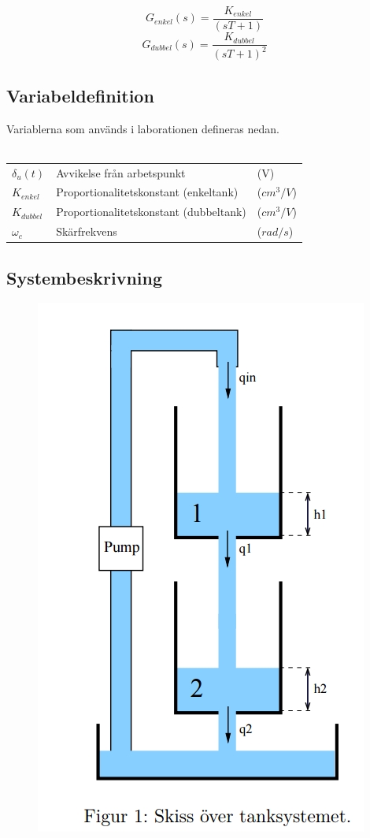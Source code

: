\documentclass[a4paper]{article}
\begin{document}
\begin{equation}
  G_{enkel}(s)=\frac{K_{enkel}}{(sT+1)}
\end{equation}
\begin{equation}
  G_{dubbel}(s)=\frac{K_{dubbel}}{(sT+1)^2}
\end{equation}

\subsection{Variabeldefinition}

Variablerna som används i laborationen defineras nedan.
\\\\
\begin{tabular}{l l l}
  $\delta_{u}(t)$ & Avvikelse från arbetspunkt & (V) \\
  $K_{enkel}$ & Proportionalitetskonstant (enkeltank) & ($cm^3/V$) \\
  $K_{dubbel}$ & Proportionalitetskonstant (dubbeltank) & ($cm^3/V$) \\
  $\omega_c$ & Skärfrekvens & ($rad/s$)
\end{tabular}

\subsection{Systembeskrivning}

\begin{figure}[!ht]
  \centering
  \includegraphics[scale = 0.5]{Skiss}
\end{figure}
\end{document}
